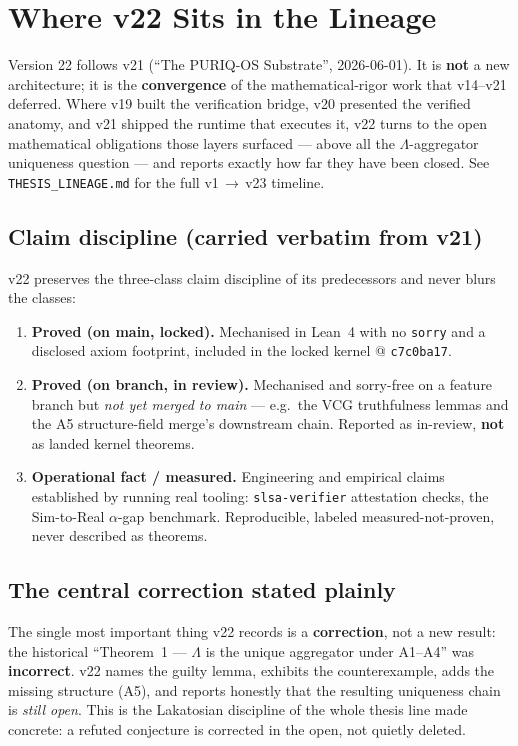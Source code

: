 \documentclass[11pt]{article}
\theoremstyle{plain}
\theoremstyle{definition}
\theoremstyle{remark}
\newcommand{\La}{\Lambda}
\begin{document}
\section{Where v22 Sits in the Lineage}

Version 22 follows v21 (``The PURIQ-OS Substrate'', 2026-06-01). It is \textbf{not}
a new architecture; it is the \textbf{convergence} of the mathematical-rigor work
that v14--v21 deferred. Where v19 built the verification bridge, v20 presented the
verified anatomy, and v21 shipped the runtime that executes it, v22 turns to the
open mathematical obligations those layers surfaced --- above all the
$\La$-aggregator uniqueness question --- and reports exactly how far they have been
closed. See \texttt{THESIS\_LINEAGE.md} for the full v1\,$\rightarrow$\,v23 timeline.

\subsection{Claim discipline (carried verbatim from v21)}
v22 preserves the three-class claim discipline of its predecessors and never blurs
the classes:
\begin{enumerate}[leftmargin=1.4em]
\item \textbf{Proved (on main, locked).} Mechanised in Lean~4 with no \texttt{sorry}
and a disclosed axiom footprint, included in the locked kernel @ \texttt{c7c0ba17}.
\item \textbf{Proved (on branch, in review).} Mechanised and sorry-free on a feature
branch but \emph{not yet merged to main} --- e.g.\ the VCG truthfulness lemmas and
the A5 structure-field merge's downstream chain. Reported as in-review, \textbf{not}
as landed kernel theorems.
\item \textbf{Operational fact / measured.} Engineering and empirical claims
established by running real tooling: \texttt{slsa-verifier} attestation checks, the
Sim-to-Real $\alpha$-gap benchmark. Reproducible, labeled measured-not-proven, never
described as theorems.
\end{enumerate}

\subsection{The central correction stated plainly}
The single most important thing v22 records is a \textbf{correction}, not a new
result: the historical ``Theorem~1 --- $\La$ is the unique aggregator under
A1--A4'' was \textbf{incorrect}. v22 names the guilty lemma, exhibits the
counterexample, adds the missing structure (A5), and reports honestly that the
resulting uniqueness chain is \emph{still open}. This is the Lakatosian discipline
of the whole thesis line made concrete: a refuted conjecture is corrected in the
open, not quietly deleted.
\end{document}
